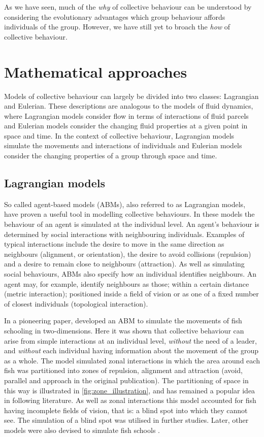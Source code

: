 As we have seen, much of the \emph{why} of collective behaviour can be understood by
considering the evolutionary advantages which group behaviour affords individuals of the
group. However, we have still yet to broach the \emph{how} of collective behaviour.

\section{Mathematical approaches}
\label{sec:models}

Models of collective behaviour can largely be divided into two classes: Lagrangian and
Eulerian.  These descriptions are analogous to the models of fluid dynamics, where
Lagrangian models consider flow in terms of interactions of fluid parcels and Eulerian
models consider the changing fluid properties at a given point in space and time. In the
context of collective behaviour, Lagrangian models simulate the movements and interactions
of individuals and Eulerian models consider the changing properties of a group through
space and time.

\subsection{Lagrangian models}
\label{ssec:lagrangian_models}

So called agent-based models (ABMs), also referred to as Lagrangian models, have proven a
useful tool in modelling collective behaviours. In these models the behaviour of an agent
is simulated at the individual level. An agent's behaviour is determined by social
interactions with neighbouring individuals. Examples of typical interactions include the
desire to move in the same direction as neighbours (alignment, or orientation), the desire
to avoid collisions (repulsion) and a desire to remain close to neighbours (attraction).
As well as simulating social behaviours, ABMs also specify how an individual identifies
neighbours. An agent may, for example, identify neighbours as those; within a certain
distance (metric interaction); positioned inside a field of vision or as one of a fixed
number of closest individuals (topological interaction).

In a pioneering paper, \textcite{aoki82} developed an ABM to simulate the movements of
fish schooling in two-dimensions. Here it was shown that collective behaviour can arise
from simple interactions at an individual level, \emph{without} the need of a leader, and
\emph{without} each individual having information about the movement of the group as a
whole.  The model simulated zonal interactions in which the area around each fish was
partitioned into zones of repulsion, alignment and attraction (avoid, parallel and
approach in the original publication). The partitioning of space in this way is
illustrated in \cref{fig:zone_illustration}, and has remained a popular idea in following
literature. As well as zonal interactions this model accounted for fish having incomplete
fields of vision, that is: a blind spot into which they cannot see. The simulation of a
blind spot was utilised in further studies. Later, other models were also devised to
simulate fish schools \parencite{okubo86, huth92}.

